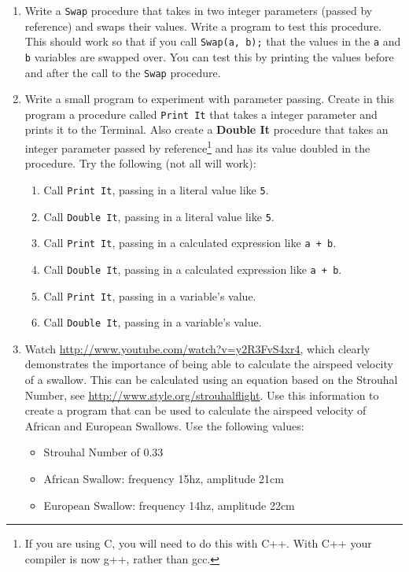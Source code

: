 \begin{enumerate}
  \item Write a \texttt{Swap} procedure that takes in two integer parameters (passed by reference) and swaps their values. Write a program to test this procedure. This should work so that if you call \texttt{Swap(a, b);} that the values in the \texttt{a} and \texttt{b} variables are swapped over. You can test this by printing the values before and after the call to the \texttt{Swap} procedure.
  \item Write a small program to experiment with parameter passing. Create in this program a procedure called \texttt{Print It} that takes a integer parameter and prints it to the Terminal. Also create a  \textbf{Double It} procedure that takes an integer parameter passed by reference\footnote{If you are using C, you will need to do this with C++. With C++ your compiler is now g++, rather than gcc.} and has its value doubled in the procedure. Try the following (not all will work):
  \begin{enumerate}
    \item Call \texttt{Print It}, passing in a literal value like \texttt{5}.
    \item Call \texttt{Double It}, passing in a literal value like \texttt{5}.
    \item Call \texttt{Print It}, passing in a calculated expression like \texttt{a + b}.
    \item Call \texttt{Double It}, passing in a calculated expression like \texttt{a + b}.
    \item Call \texttt{Print It}, passing in a variable's value.
    \item Call \texttt{Double It}, passing in a variable's value.
  \end{enumerate}
  
  \clearpage
  \item Watch \url{http://www.youtube.com/watch?v=y2R3FvS4xr4}, which clearly demonstrates the importance of being able to calculate the airspeed velocity of a swallow. This can be calculated using an equation based on the Strouhal Number, see \url{http://www.style.org/strouhalflight}. Use this information to create a program that can be used to calculate the airspeed velocity of African and European Swallows. Use the following values:
  \begin{itemize}
    \item Strouhal Number of 0.33
    \item African Swallow: frequency 15hz, amplitude 21cm
    \item European Swallow: frequency 14hz, amplitude 22cm
  \end{itemize}
\end{enumerate}

